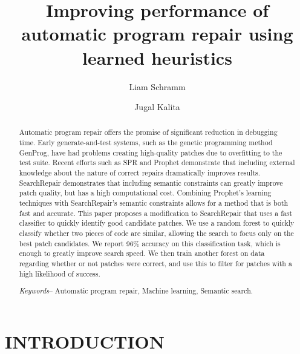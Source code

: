 \documentclass[conference]{IEEEtran}
\title{\LARGE \bf
Improving performance of automatic program repair using learned heuristics
}
\author{Liam Schramm}
\affil{Bard College}
\author{Jugal Kalita}
\affil{UCCS}
\begin{document}
\maketitle
\thispagestyle{empty}
\pagestyle{empty}


\begin{abstract}

Automatic program repair offers the promise of significant reduction in debugging time.
 Early generate-and-test systems, such as the genetic programming method GenProg, have had problems creating high-quality patches due to overfitting to the test suite. 
 Recent efforts such as SPR and Prophet demonstrate that including external knowledge about the nature of correct repairs dramatically improves results. SearchRepair demonstrates that including semantic constraints can greatly improve patch quality, but has a high computational cost.  
 Combining Prophet's learning techniques with SearchRepair's semantic constraints allows for a method that is both fast and accurate. 
 This paper proposes a modification to SearchRepair that uses a fast classifier to quickly identify good candidate patches. 
 We use a random forest to quickly classify whether two pieces of code are similar, allowing the search to focus only on the best patch candidates. We report 96\% accuracy on this classification task, which is enough to greatly improve search speed. 
 We then train another forest on data regarding whether or not patches were correct, and use this to filter for patches with a high likelihood of success.


\textit{Keywords}-- Automatic program repair, Machine learning, Semantic search.


\end{abstract}




\section{INTRODUCTION}
\end{document}
